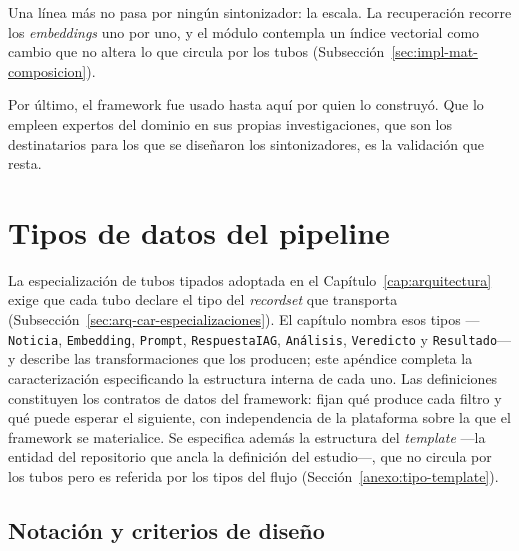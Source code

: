 \documentclass[12pt]{report}
\begin{document}
Una línea más no pasa por ningún sintonizador: la escala. La recuperación recorre los \textit{embeddings} uno por uno, y el módulo contempla un índice vectorial como cambio que no altera lo que circula por los tubos (Subsección~\ref{sec:impl-mat-composicion}).

Por último, el framework fue usado hasta aquí por quien lo construyó. Que lo empleen expertos del dominio en sus propias investigaciones, que son los destinatarios para los que se diseñaron los sintonizadores, es la validación que resta.




\appendix


\chapter{Tipos de datos del pipeline}
\label{anexo:tipos}

La especialización de tubos tipados adoptada en el Capítulo~\ref{cap:arquitectura} exige que cada tubo declare el tipo del \textit{recordset} que transporta (Subsección~\ref{sec:arq-car-especializaciones}). El capítulo nombra esos tipos ---\texttt{Noticia}, \texttt{Embedding}, \texttt{Prompt}, \texttt{RespuestaIAG}, \texttt{Análisis}, \texttt{Veredicto} y \texttt{Resultado}--- y describe las transformaciones que los producen; este apéndice completa la caracterización especificando la estructura interna de cada uno. Las definiciones constituyen los contratos de datos del framework: fijan qué produce cada filtro y qué puede esperar el siguiente, con independencia de la plataforma sobre la que el framework se materialice. Se especifica además la estructura del \textit{template} ---la entidad del repositorio que ancla la definición del estudio---, que no circula por los tubos pero es referida por los tipos del flujo (Sección~\ref{anexo:tipo-template}).

\section{Notación y criterios de diseño}
\label{anexo:tipos-notacion}
\end{document}
